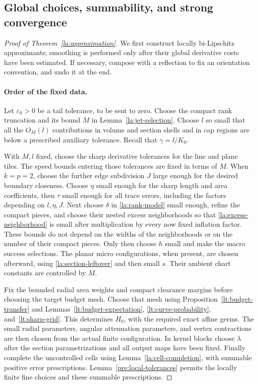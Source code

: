 \documentclass[11pt]{article}
\numberwithin{equation}{section}
\theoremstyle{definition}
\theoremstyle{remark}
\begin{document}
\subsection{Global choices, summability, and strong convergence}

\begin{proof}[Proof of Theorem~\ref{la:approximation}]
We first construct locally bi-Lipschitz approximants; smoothing is
performed only after their global derivative costs have been
estimated.  If necessary, compose with a reflection to fix an
orientation convention, and undo it at the end.

\paragraph{Order of the fixed data.}
Let $\varepsilon_0>0$ be a tail tolerance, to be sent to zero.
Choose the compact rank truncation and its bound $M$ in
Lemma~\ref{la:jet-selection}.  Choose $l$ so small that all the
$O_M(l)$ contributions in volume and section shells and in cap
regions are below a prescribed auxiliary tolerance.  Recall that
$\gamma=l/K_0$.

With $M,l$ fixed, choose the sharp derivative tolerances for the
line and plane tiles.  The speed bounds entering those tolerances
are fixed in terms of $M$.  When $k=p=2$, choose the further edge
subdivision $J$ large enough for the desired boundary closeness.
Choose $\eta$ small enough for the sharp length and area coefficients,
then $\tau$ small enough for all trace errors, including the factors
depending on $l,\eta,J$.  Next choose $\delta$ in
\eqref{la:rank-model} small enough, refine the compact pieces, and
choose their nested excess neighborhoods so that
\eqref{la:excess-neighborhood} is small after multiplication by every
now fixed inflation factor.  These bounds do not depend on the
widths of the neighborhoods or on the number of their compact
pieces.  Only then choose $h$ small and make the macro success
selections.  The planar micro configurations, when present, are
chosen afterward, using \eqref{la:section-leftover} and then small
$s$.  Their ambient chart constants are controlled by $M$.

Fix the bounded radial area weights and compact clearance margins
before choosing the target budget mesh.  Choose that mesh using
Proposition~\ref{lt:budget-transfer} and Lemmas~\ref{lt:budget-expectation},
\ref{lt:curve-probability}, and~\ref{lt:sharp-grid}.  This determines
$H_0$, with the required exact affine germs.  The small radial
parameters, angular attenuation parameters, and vertex contractions
are then chosen from the actual finite configuration.  In kernel
blocks choose $\lambda$ after the section parametrizations and all
output maps have been fixed.  Finally complete the uncontrolled
cells using Lemma~\ref{la:cell-completion}, with summable positive
error prescriptions.  Lemma~\ref{pre:local-tolerances} permits the
locally finite fine choices and these summable prescriptions.


\end{proof}
\end{document}
